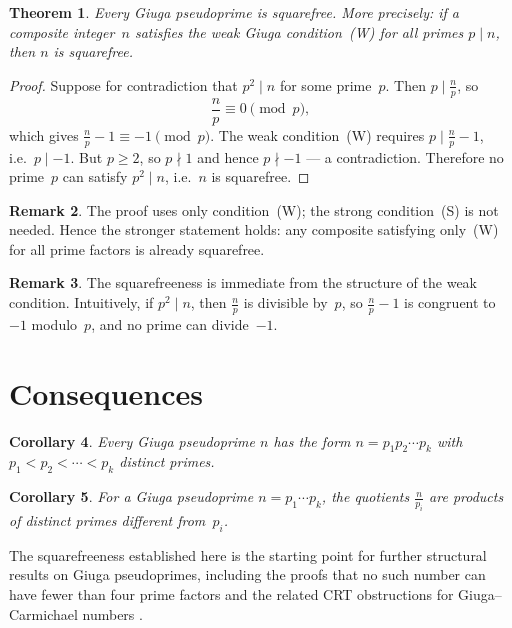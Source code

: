 \documentclass[12pt,a4paper]{amsart}
\newtheorem{theorem}{Theorem}[section]
\newtheorem{corollary}[theorem]{Corollary}
\theoremstyle{definition}
\newtheorem{remark}[theorem]{Remark}
\begin{document}
\begin{theorem}
\label{thm:sqfree}
Every Giuga pseudoprime is squarefree.  More precisely: if a composite integer~$n$
satisfies the weak Giuga condition~\textup{(W)} for all primes $p \mid n$, then
$n$ is squarefree.
\end{theorem}

\begin{proof}
Suppose for contradiction that $p^2 \mid n$ for some prime~$p$.
Then $p \mid \tfrac{n}{p}$, so
\[
  \frac{n}{p} \equiv 0 \pmod{p},
\]
which gives $\tfrac{n}{p} - 1 \equiv -1 \pmod{p}$.
The weak condition~(W) requires $p \mid \tfrac{n}{p} - 1$, i.e.\ $p \mid -1$.
But $p \ge 2$, so $p \nmid 1$ and hence $p \nmid -1$ — a contradiction.
Therefore no prime~$p$ can satisfy $p^2 \mid n$, i.e.\ $n$ is squarefree.
\end{proof}

\begin{remark}
The proof uses only condition~(W); the strong condition~(S) is not needed.
Hence the stronger statement holds: any composite satisfying only~(W) for
all prime factors is already squarefree.
\end{remark}

\begin{remark}
The squarefreeness is immediate from the structure of the weak condition.
Intuitively, if $p^2 \mid n$, then $\tfrac{n}{p}$ is divisible by~$p$, so
$\tfrac{n}{p} - 1$ is congruent to~$-1$ modulo~$p$, and no prime can
divide~$-1$.
\end{remark}

\section{Consequences}

\begin{corollary}
Every Giuga pseudoprime $n$ has the form $n = p_1 p_2 \cdots p_k$
with $p_1 < p_2 < \cdots < p_k$ distinct primes.
\end{corollary}

\begin{corollary}
For a Giuga pseudoprime $n = p_1 \cdots p_k$, the quotients
$\tfrac{n}{p_i}$ are products of distinct primes different from~$p_i$.
\end{corollary}

The squarefreeness established here is the starting point for further structural
results on Giuga pseudoprimes, including the proofs that no such number can have
fewer than four prime factors \cite{Ingwer2026a} and the related CRT obstructions
for Giuga--Carmichael numbers \cite{Ingwer2026c}.
\end{document}
